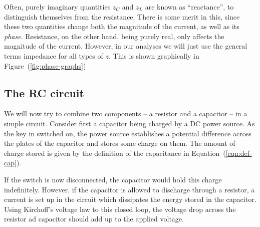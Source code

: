 \begin{imp}
    Often, purely imaginary quantities $z_C$ and $z_L$ are known as ``reactance'', to distinguish themselves from the resistance. There is some merit in this, since these two quantities change both the magnitude of the current, as well as its \textsl{phase}. Resistance, on the other hand, being purely real, only affects the magnitude of the current. However, in our analyses we will just use the general terms impedance for all types of $z$. This is shown graphically in Figure~(\ref{fig:phase-graphs})
\end{imp}



\subsection*{The RC circuit}

We will now try to combine two components -- a resistor and a capacitor -- in a simple circuit. Consider first a capacitor being charged by a DC power source. As the key in switched on, the power source establishes a potential difference across the plates of the capacitor and stores some charge on them. The amount of charge stored is given by the definition of the capacitance in Equation~(\ref{eqn:def-cap}).

If the switch is now disconnected, the capacitor would hold this charge indefinitely. However, if the capacitor is allowed to discharge through a resistor, a current is set up in the circuit which dissipates the energy stored in the capacitor. Using Kirchoff's voltage law to this closed loop, the voltage drop across the resistor ad capacitor should add up to the applied voltage.

